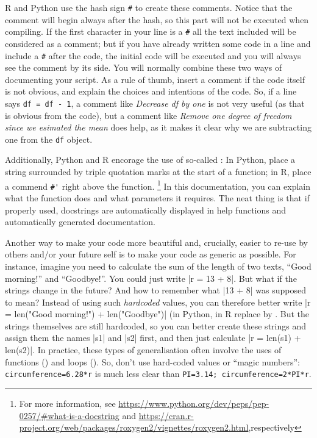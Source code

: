 R and Python use the hash sign \texttt{\#} to create these comments. Notice that the comment will begin always after the hash, so this part will not be executed when compiling. If the first character in your line is  a \texttt{\#} all the text included will be considered as a comment; but if you have already written some code in a line and include a \texttt{\#} after the code, the initial code will be executed and you will always see the comment by its side. You will normally combine these two ways of documenting your script.
As a rule of thumb, insert a comment if the code itself is not obvious,
and explain the choices and intentions of the code.
So, if a line says \verb|df = df - 1|, a comment like \emph{Decrease df by one} is not very useful (as that is obvious from the code), but a comment like \emph{Remove one degree of freedom since we esimated the mean} does help, as it makes it clear why we are subtracting one from the \verb|df| object.

Additionally, Python and R encorage the use of so-called :
In Python, place a string surrounded by triple quotation marks at the start of a function; in R, place a commend \verb|#'| right above the function.
\footnote{For more information, see \url{https://www.python.org/dev/peps/pep-0257/\#what-is-a-docstring} and \url{https://cran.r-project.org/web/packages/roxygen2/vignettes/roxygen2.html},respectively}
In this documentation, you can explain what the function does and what parameters it requires. 
The neat thing is that if properly used, docstrings are automatically displayed in help functions and automatically generated documentation.

Another way to make your code more beautiful and, crucially, easier to re-use by others and/or your future self is to make your code as generic as possible. For instance, imagine you need to calculate the sum of the length of two texts, ``Good morning!'' and ``Goodbye!''. You could just write |r = 13 + 8|. But what if the strings change in the future? And how to remember what |13 + 8| was supposed to mean? Instead of using such \emph{hardcoded} values, you can therefore better write |r = len("Good morning!") + len("Goodbye")| (in Python, in R replace  by . But the strings themselves are still hardcoded, so you can better create these strings and assign them the names |s1| and |s2| first, and then just calculate |r = len(s1) + len(s2)|. In practice, these types of generalisation often involve the uses of functions () and loops (). So, don't use hard-coded values or ``magic numbers'': \verb+circumference=6.28*r+ is much less clear than \verb+PI=3.14; circumference=2*PI*r+.

